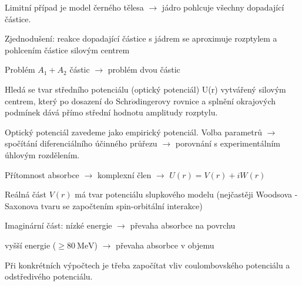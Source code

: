 \documentclass[../../main.tex]{subfiles}
\begin{document}
Limitní případ je model černého tělesa $\rightarrow$ jádro pohlcuje všechny dopadající částice.

Zjednodušení: reakce dopadající částice s jádrem se aproximuje rozptylem a pohlcením částice silovým centrem

Problém $A_1 + A_2$ částic $\rightarrow$ problém dvou částic

Hledá se tvar středního potenciálu (optický potenciál) U(r) vytvářený silovým centrem, který po dosazení do Schr$\ddot{o}$dingerovy rovnice a splnění okrajových podmínek dává přímo střední hodnotu amplitudy rozptylu.

Optický potenciál zavedeme jako empirický potenciál. Volba parametrů $\rightarrow$ spočítání diferenciálního účinného průřezu $\rightarrow$ porovnání s experimentálním úhlovým rozdělením.

Přítomnost absorbce $\rightarrow$ komplexní člen $\rightarrow$ $U(r) = V(r) + i W(r)$

Reálná část $V(r)$ má tvar potenciálu slupkového modelu (nejčastěji Woodsova - Saxonova tvaru se započtením spin-orbitální interakce) 

Imaginární část: nízké energie $\rightarrow$ převaha absorbce na povrchu

vyšší energie ($\geq 80 ~\mathrm{MeV}$) $\rightarrow$ převaha absorbce v objemu

Při konkrétních výpočtech je třeba započítat vliv coulombovského potenciálu a odstředivého potenciálu.
\end{document}
